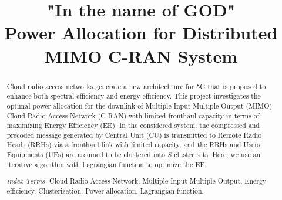 \documentclass[journal,onecolumn,11pt,draftcls,doublespace]{IEEEtran}
\begin{document}
\title{"In the name of GOD" \\[2in] Power Allocation for Distributed MIMO C-RAN System } \author{

    \vspace{2cm}
    }

\maketitle

\newpage
\begin{abstract}
Cloud radio access networks generate a new architechture for 5G that is proposed to enhance both spectral efficiency and energy efficiency. 
This project investigates the optimal power allocation for the downlink of Multiple-Input Multiple-Output (MIMO) Cloud Radio Access Network (C-RAN) with limited fronthaul capacity in terms of maximizing Energy Efficiency (EE). 
In the considered system, the compressed and precoded message generated by Central Unit (CU) is transmitted to Remote Radio Heads (RRHs) via a fronthaul link with limited capacity, and the RRHs and Users Equipments (UEs) are assumed to be clustered into $S$ cluster sets.
Here, we use an iterative algorithm with Lagrangian function to optimize the EE.


 \emph{index Terms}- Cloud Radio Access Network, Multiple-Input Multiple-Output, Energy efficiency, Clusterization, Power allocation, Lagrangian function.
\end{abstract}
\IEEEpeerreviewmaketitle
\newpage
\tableofcontents
\newpage
\listoffigures
\listoftables
\newpage
\end{document}
